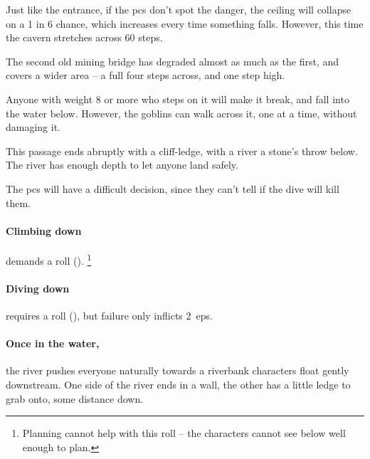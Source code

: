 \begin{multicols}{2}
\caveIn

Just like the entrance, if the \glspl{pc} don't spot the danger, the ceiling will collapse on a 1 in 6 chance, which increases every time something falls.
However, this time the cavern stretches across 60 steps.



\begin{exampletext}
  The second old mining bridge has degraded almost as much as the first, and covers a wider area -- a full four \glspl{step} across, and one \gls{step} high.
\end{exampletext}

Anyone with \gls{weight} 8 or more who steps on it will make it break, and fall into the water below.
However, the goblins can walk across it, one at a time, without damaging it.





This passage ends abruptly with a cliff-ledge, with a river a stone's throw below.
The river has enough depth to let anyone land safely.

The \glspl{pc} will have a difficult decision, since they can't tell if the dive will kill them.

\paragraph{Climbing down}
demands a  roll (\tn[9]).%
\footnote{Planning cannot help with this roll -- the characters cannot see below well enough to plan.}

\paragraph{Diving down}
requires a  roll (\tn[10]), but failure only inflicts 2~\glspl{ep}.

\paragraph{Once in the water,}
the river pushes everyone naturally towards a riverbank
characters float gently downstream.
One side of the river ends in a wall, the other has a little ledge to grab onto, some distance down.


\end{multicols}
